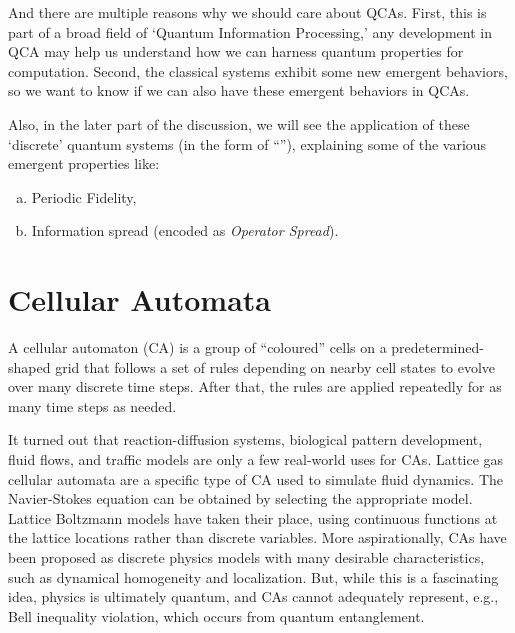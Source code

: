 \documentclass[11pt, oneside]{scrbook}
\begin{document}
And there are multiple reasons why we should care about QCAs. First, this is part of a broad field of `Quantum Information Processing,' any development in QCA may help us understand how we can harness quantum properties for computation. Second, the classical systems exhibit some new emergent behaviors, so we want to know if we can also have these emergent behaviors in QCAs.


Also, in the later part of the discussion, we will see the application of these `discrete' quantum systems (in the form of ``''\cite{Fisher2023}), explaining some of the various emergent properties like:
\begin{enumerate}[(a), noitemsep]
    \item Periodic Fidelity,
    \item Information spread (encoded as \emph{Operator Spread}).
\end{enumerate}

\section{Cellular Automata}

A cellular automaton (CA) is a group of ``coloured'' cells on a predetermined-shaped grid that follows a set of rules depending on nearby cell states to evolve over many discrete time steps. After that, the rules are applied repeatedly for as many time steps as needed.

It turned out that reaction-diffusion systems, biological pattern development, fluid flows, and traffic models are only a few real-world uses for CAs. Lattice gas cellular automata are a specific type of CA used to simulate fluid dynamics. The Navier-Stokes equation can be obtained by selecting the appropriate model. Lattice Boltzmann models have taken their place, using continuous functions at the lattice locations rather than discrete variables. More aspirationally, CAs have been proposed as discrete physics models with many desirable characteristics, such as dynamical homogeneity and localization. But, while this is a fascinating idea, physics is ultimately quantum, and CAs cannot adequately represent, e.g., Bell inequality violation, which occurs from quantum entanglement.
\end{document}
